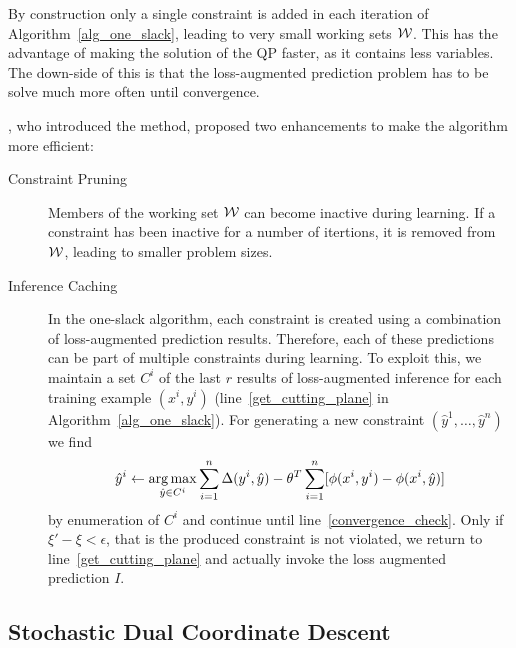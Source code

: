 By construction only a single constraint is added in each iteration of
Algorithm~\ref{alg_one_slack}, leading to very small working sets $\mathcal{W}$.
This has the advantage of making the solution of the QP faster, as it contains
less variables. The down-side of this is that the loss-augmented prediction
problem has to be solve much more often until convergence.

\citet{joachims2009cutting}, who introduced the method, proposed two enhancements
to make the algorithm more efficient:
\begin{description}
    \item[Constraint Pruning] Members of the working set $\mathcal{W}$ can become inactive during learning.
        If a constraint has been inactive for a number of itertions, it is removed from $\mathcal{W}$, leading
        to smaller problem sizes.
    \item[Inference Caching] In the one-slack algorithm, each constraint is
        created using a combination of loss-augmented prediction results.
        Therefore, each of these predictions can be part of multiple
        constraints during learning.
        To exploit this, we maintain a set $C^i$ of the last $r$ results of
        loss-augmented inference for each training example $(x^i, y^i)$
        (line~\ref{get_cutting_plane} in Algorithm~\ref{alg_one_slack}).
        For generating a new constraint $(\hat{y}^1, \dotsc, \hat{y}^n)$ we
        find
        \[ \hat{y}^i \leftarrow \operatorname*{arg\,max}_{\hat{y}\in C^i} \sum_{i=1}^n
            \Delta(y^i, \hat{y}) - \theta^T \sum_{i=1}^n [\phi(x^i, y^i) -
                \phi(x^i, \hat{y})] \]
        by enumeration of $C^i$ and continue until
        line~\ref{convergence_check}.  Only if $\xi' - \xi < \epsilon$, that is
        the produced constraint is not violated, we return to
        line~\ref{get_cutting_plane} and actually invoke the loss augmented
        prediction $I$.
\end{description}


\subsection{Stochastic Dual Coordinate Descent}


